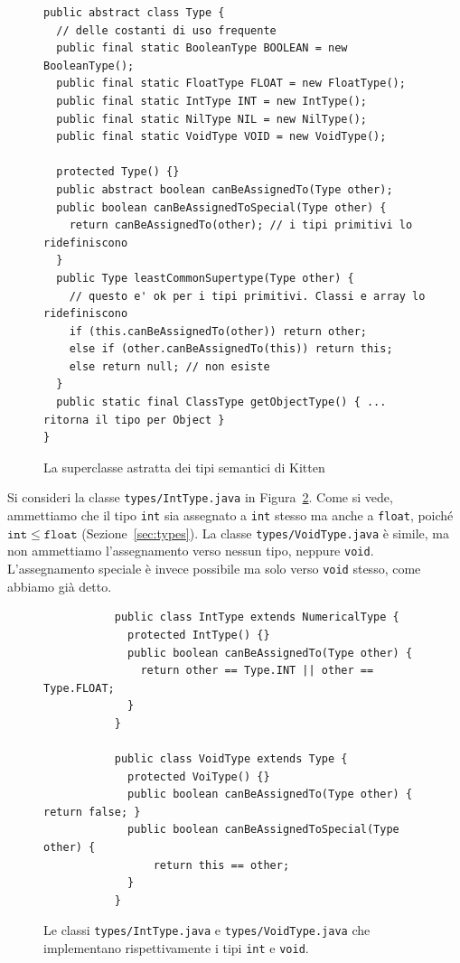 \begin{figure}[t]
{\small
\begin{verbatim}
public abstract class Type {
  // delle costanti di uso frequente
  public final static BooleanType BOOLEAN = new BooleanType();
  public final static FloatType FLOAT = new FloatType();
  public final static IntType INT = new IntType();
  public final static NilType NIL = new NilType();
  public final static VoidType VOID = new VoidType();

  protected Type() {}
  public abstract boolean canBeAssignedTo(Type other);
  public boolean canBeAssignedToSpecial(Type other) {
    return canBeAssignedTo(other); // i tipi primitivi lo ridefiniscono
  }
  public Type leastCommonSupertype(Type other) {
    // questo e' ok per i tipi primitivi. Classi e array lo ridefiniscono
    if (this.canBeAssignedTo(other)) return other;
    else if (other.canBeAssignedTo(this)) return this;
    else return null; // non esiste
  }
  public static final ClassType getObjectType() { ... ritorna il tipo per Object }
}
\end{verbatim}
}
\caption{La superclasse astratta dei tipi semantici di Kitten}
  \label{fig:types.Type}
\end{figure}

Si consideri la classe \texttt{types/IntType.java}
in Figura~\ref{fig:types.IntVoidType}.
Come si vede, ammettiamo che il tipo \texttt{int} sia assegnato a
\texttt{int} stesso ma anche a \texttt{float}, poich\'e
$\mathtt{int}\le\mathtt{float}$ (Sezione~\ref{sec:types}).
La classe \texttt{types/VoidType.java} \`e simile, ma non ammettiamo
l'assegnamento verso nessun tipo, neppure \texttt{void}.
L'assegnamento speciale \`e invece possibile ma solo verso \texttt{void}
stesso, come abbiamo gi\`a detto.
%
\begin{figure}
{\small
\begin{verbatim}
           public class IntType extends NumericalType {
             protected IntType() {}
             public boolean canBeAssignedTo(Type other) {
               return other == Type.INT || other == Type.FLOAT;
             }
           }

           public class VoidType extends Type {
             protected VoiType() {}
             public boolean canBeAssignedTo(Type other) { return false; }
             public boolean canBeAssignedToSpecial(Type other) {
                 return this == other;
             }
           }
\end{verbatim}}
\caption{Le classi \texttt{types/IntType.java} e
         \texttt{types/VoidType.java} che implementano rispettivamente i tipi
         \texttt{int} e \texttt{void}.}
  \label{fig:types.IntVoidType}
\end{figure}

